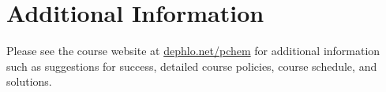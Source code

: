 \documentclass[letterpaper,oneside,onecolumn,11pt,article]{memoir}
\begin{document}
\section{Additional Information}

Please see the course website at \href{http://dephlo.net/pchem}{dephlo.net/pchem} for additional information such as suggestions for success, detailed course policies, course schedule, and solutions. 
\end{document}
